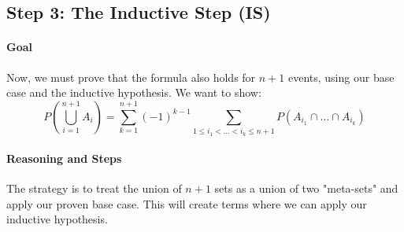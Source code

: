 \documentclass[11pt,a4paper]{article}
\begin{document}
\subsection{Step 3: The Inductive Step (IS)}

\paragraph{Goal}
Now, we must prove that the formula also holds for $n+1$ events, using our base case and the inductive hypothesis. We want to show:
$$ P\left(\bigcup_{i=1}^{n+1} A_i\right) = \sum_{k=1}^{n+1} (-1)^{k-1} \sum_{1 \le i_1 < \dots < i_k \le n+1} P(A_{i_1} \cap \dots \cap A_{i_k}) $$

\paragraph{Reasoning and Steps}
The strategy is to treat the union of $n+1$ sets as a union of two "meta-sets" and apply our proven base case. This will create terms where we can apply our inductive hypothesis.
\end{document}
